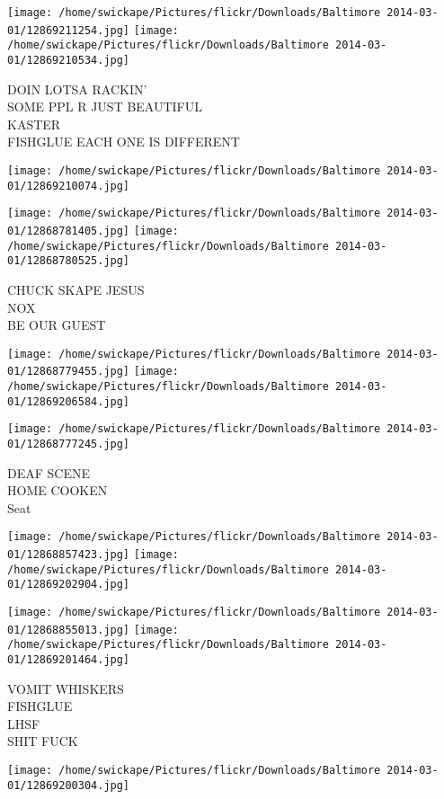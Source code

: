 \documentclass[10pt,letterpaper]{article}
\begin{document}
\texttt{[image: /home/swickape/Pictures/flickr/Downloads/Baltimore 2014-03-01/12869211254.jpg]}
\texttt{[image: /home/swickape/Pictures/flickr/Downloads/Baltimore 2014-03-01/12869210534.jpg]}

DOIN LOTSA RACKIN'\\
SOME PPL R JUST BEAUTIFUL\\
KASTER\\
FISHGLUE EACH ONE IS DIFFERENT
\pagebreak

\texttt{[image: /home/swickape/Pictures/flickr/Downloads/Baltimore 2014-03-01/12869210074.jpg]}

\vspace{0.25in}
\texttt{[image: /home/swickape/Pictures/flickr/Downloads/Baltimore 2014-03-01/12868781405.jpg]}
\texttt{[image: /home/swickape/Pictures/flickr/Downloads/Baltimore 2014-03-01/12868780525.jpg]}

CHUCK SKAPE JESUS\\
NOX\\
BE OUR GUEST
\pagebreak

\texttt{[image: /home/swickape/Pictures/flickr/Downloads/Baltimore 2014-03-01/12868779455.jpg]}
\texttt{[image: /home/swickape/Pictures/flickr/Downloads/Baltimore 2014-03-01/12869206584.jpg]}

\vspace{0.25in}
\texttt{[image: /home/swickape/Pictures/flickr/Downloads/Baltimore 2014-03-01/12868777245.jpg]}

DEAF SCENE\\
HOME COOKEN\\
Seat
\pagebreak

\texttt{[image: /home/swickape/Pictures/flickr/Downloads/Baltimore 2014-03-01/12868857423.jpg]}
\texttt{[image: /home/swickape/Pictures/flickr/Downloads/Baltimore 2014-03-01/12869202904.jpg]}

\texttt{[image: /home/swickape/Pictures/flickr/Downloads/Baltimore 2014-03-01/12868855013.jpg]}
\texttt{[image: /home/swickape/Pictures/flickr/Downloads/Baltimore 2014-03-01/12869201464.jpg]}

VOMIT WHISKERS\\
FISHGLUE\\
LHSF\\
SHIT FUCK
\pagebreak

\texttt{[image: /home/swickape/Pictures/flickr/Downloads/Baltimore 2014-03-01/12869200304.jpg]}
\end{document}

